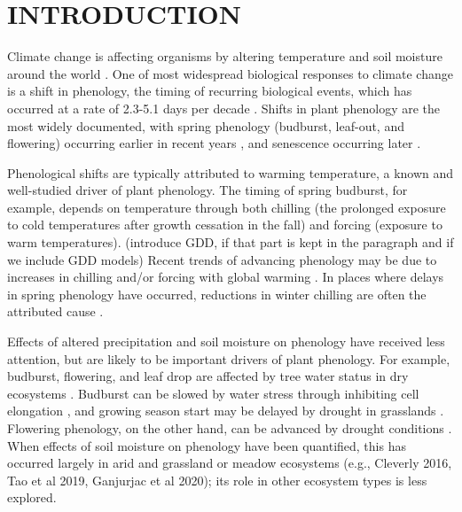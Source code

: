 \documentclass{article}
\begin{document}
\section* {INTRODUCTION} 
\par Climate change is affecting organisms by altering temperature and soil moisture around the world \citep{parmesan2006,chen2011}. One of most widespread biological responses to climate change is a shift in phenology, the timing of recurring biological events, which has occurred at a rate of 2.3-5.1 days per decade \citep{parmesan2006,poloczanska2013,root2003}. Shifts in plant phenology are the most widely documented, with spring phenology (budburst, leaf-out, and flowering) occurring earlier in recent years \citep{wolkovich2012}, and senescence occurring later \citep{taylor2008,delpierre2009}. 
\par Phenological shifts are typically attributed to warming temperature, a known and well-studied driver of plant phenology. The timing of spring budburst, for example, depends on temperature through both chilling (the prolonged exposure to cold temperatures after growth cessation in the fall) and forcing (exposure to warm temperatures). (introduce GDD, if that part is kept in the paragraph and if we include GDD models) Recent trends of advancing phenology may be due to increases in chilling and/or forcing with global warming \citep{fujisawa2010, ibanez2010,cook2012b}. In places where delays in spring phenology have occurred, reductions in winter chilling are often the attributed cause \citep{yu2010}. 
\par Effects of altered precipitation and soil moisture on phenology have received less attention, but are likely to be important drivers of plant phenology. For example, budburst, flowering, and leaf drop are affected by tree water status in dry ecosystems \citep[e.g., ][]{essiamah1986,reich1984, van1993}. Budburst can be slowed by water stress through inhibiting cell elongation \citep{essiamah1986}, and growing season start may be delayed by drought in grasslands \cite{cui2017}. Flowering phenology, on the other hand, can be advanced by drought conditions \citep{hamann2018}. When effects of soil moisture on phenology have been quantified, this has occurred largely in arid and grassland or meadow ecosystems (e.g., Cleverly 2016, Tao et al 2019, Ganjurjac et al 2020); its role in other ecosystem types is less explored. %
\end{document}
